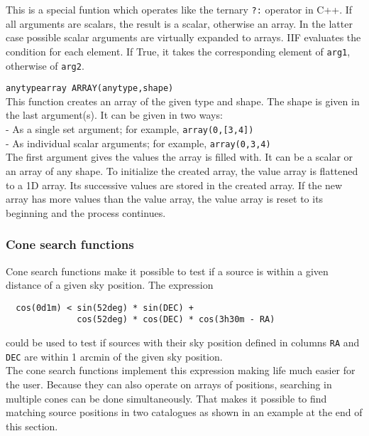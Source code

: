 \begin{description}
    This is a special funtion which operates like the ternary \texttt{?:}
    operator in C++. 
    If all arguments are scalars, the result is a scalar, otherwise
    an array. In the latter case possible scalar arguments are
    virtually expanded to arrays.
    IIF evaluates the condition for each element. If True, it takes
    the corresponding element of \texttt{arg1}, otherwise of \texttt{arg2}.
  \item[] \texttt{anytypearray ARRAY(anytype,shape)}\\
    This function creates an array of the given type and shape.
    The shape is given in the last argument(s).
    It can be given in two ways:
    \\- As a single set argument; for example, \texttt{array(0,[3,4])}
    \\- As individual scalar arguments; for example, \texttt{array(0,3,4)}
    \\The first argument gives the values the array is filled with.
    It can be a scalar or an array of any shape. To initialize the
    created array, the value array is flattened to a 1D array.
    Its successive values are stored in the created array. If the
    new array has more values than the value array, the value array is
    reset to its beginning and the process continues.
\end{description}

\subsubsection{\label{TAQL:CONESEARCH}Cone search functions}
Cone search functions make it possible to test if a source is
within a given distance of a given sky position. The expression
\begin{verbatim}
  cos(0d1m) < sin(52deg) * sin(DEC) +
              cos(52deg) * cos(DEC) * cos(3h30m - RA)
\end{verbatim}
could be used to test if sources with their sky position defined
in columns \texttt{RA} and \texttt{DEC} are within 1 arcmin of the
given sky position.
\\The cone search functions implement this expression making life much
easier for the user. Because they
can also operate on arrays of positions, searching in
multiple cones can be done simultaneously. That makes it
possible to find matching source positions in two catalogues as shown
in an example at the end of this section.

